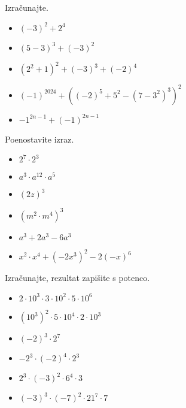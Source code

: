             \begin{multicols}{2}
                
                \begin{naloga}
                    Izračunajte.
                    \begin{itemize}
                        \item $(-3)^2+2^4$ 
                        \item $(5-3)^3+(-3)^2$ 
                        \item $(2^2+1)^2+(-3)^3+(-2)^4$ 
                        \item $(-1)^{2024}+((-2)^5+5^2-(7-3^2)^3)^2$ 
                        \item $-1^{2n-1}+(-1)^{2n-1}$ 
                    \end{itemize}
                \end{naloga}

                \begin{naloga}
                        Poenostavite izraz.
                    \begin{itemize}
                        \item $2^7\cdot 2^3$ 
                        \item $a^3\cdot a^{12}\cdot a^5$ 
                        \item $(2z)^3$ 
                        \item $(m^2\cdot m^4)^3$ 
                        \item $a^3+2a^3-6a^3$ 
                        \item $x^2\cdot x^4+(-2x^3)^2-2(-x)^6$ 
                    \end{itemize}
                \end{naloga}

                
        \begin{naloga}
            Izračunajte, rezultat zapišite s potenco.
            \begin{itemize}
                \item $2\cdot 10^3\cdot 3\cdot 10^2\cdot 5\cdot 10^6$ 
                \item $(10^3)^2\cdot5\cdot 10^4\cdot 2\cdot 10^3$ 
                \item $(-2)^3\cdot 2^7$ 
                \item $-2^3\cdot (-2)^4\cdot 2^3$ 
                \item $2^3\cdot(-3)^2\cdot 6^4\cdot 3$ 
                \item $(-3)^3\cdot(-7)^2\cdot 21^7\cdot 7$ 
            \end{itemize}
        \end{naloga}


\end{multicols}
